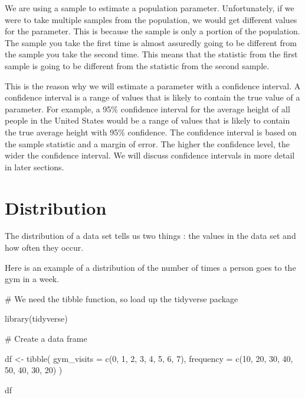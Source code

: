 \documentclass[
  letterpaper,
  DIV=11,
  numbers=noendperiod]{scrreprt}
\newenvironment{Shaded}{\begin{snugshade}}{\end{snugshade}}
\newcommand{\AttributeTok}[1]{\textcolor[rgb]{0.40,0.45,0.13}{#1}}
\newcommand{\CommentTok}[1]{\textcolor[rgb]{0.37,0.37,0.37}{#1}}
\newcommand{\DecValTok}[1]{\textcolor[rgb]{0.68,0.00,0.00}{#1}}
\newcommand{\FunctionTok}[1]{\textcolor[rgb]{0.28,0.35,0.67}{#1}}
\newcommand{\NormalTok}[1]{\textcolor[rgb]{0.00,0.23,0.31}{#1}}
\newcommand{\OtherTok}[1]{\textcolor[rgb]{0.00,0.23,0.31}{#1}}
\begin{document}

We are using a sample to estimate a population parameter. Unfortunately,
if we were to take multiple samples from the population, we would get
different values for the parameter. This is because the sample is only a
portion of the population. The sample you take the first time is almost
assuredly going to be different from the sample you take the second
time. This means that the statistic from the first sample is going to be
different from the statistic from the second sample.

This is the reason why we will estimate a parameter with a confidence
interval. A confidence interval is a range of values that is likely to
contain the true value of a parameter. For example, a 95\% confidence
interval for the average height of all people in the United States would
be a range of values that is likely to contain the true average height
with 95\% confidence. The confidence interval is based on the sample
statistic and a margin of error. The higher the confidence level, the
wider the confidence interval. We will discuss confidence intervals in
more detail in later sections.

\section*{Distribution}\label{distribution}


The distribution of a data set tells us two things : the values in the
data set and how often they occur.

Here is an example of a distribution of the number of times a person
goes to the gym in a week.

\begin{Shaded}
\begin{Highlighting}[]
\CommentTok{\# We need the tibble function, so load up the tidyverse package}

\FunctionTok{library}\NormalTok{(tidyverse)}
\end{Highlighting}
\end{Shaded}

\begin{Shaded}
\begin{Highlighting}[]
\CommentTok{\# Create a data frame}

\NormalTok{df }\OtherTok{\textless{}{-}} \FunctionTok{tibble}\NormalTok{(}
  \AttributeTok{gym\_visits =} \FunctionTok{c}\NormalTok{(}\DecValTok{0}\NormalTok{, }\DecValTok{1}\NormalTok{, }\DecValTok{2}\NormalTok{, }\DecValTok{3}\NormalTok{, }\DecValTok{4}\NormalTok{, }\DecValTok{5}\NormalTok{, }\DecValTok{6}\NormalTok{, }\DecValTok{7}\NormalTok{),}
  \AttributeTok{frequency =} \FunctionTok{c}\NormalTok{(}\DecValTok{10}\NormalTok{, }\DecValTok{20}\NormalTok{, }\DecValTok{30}\NormalTok{, }\DecValTok{40}\NormalTok{, }\DecValTok{50}\NormalTok{, }\DecValTok{40}\NormalTok{, }\DecValTok{30}\NormalTok{, }\DecValTok{20}\NormalTok{)}
\NormalTok{)}

\NormalTok{df}
\end{Highlighting}
\end{Shaded}
\end{document}
